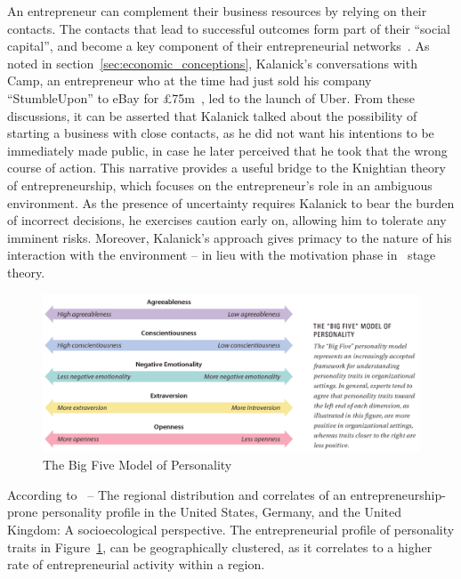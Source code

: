     An entrepreneur can complement their business resources by relying on their contacts. The contacts that lead to successful outcomes form part of their ``social capital'', and become a key component of their entrepreneurial networks~\parencite{burt1995}. As noted in section~\ref{sec:economic_conceptions}, Kalanick's conversations with Camp, an entrepreneur who at the time had just sold his company ``StumbleUpon'' to eBay for \pounds75m~\parencite{gonzalez2007}, led to the launch of Uber. From these discussions, it can be asserted that Kalanick talked about the possibility of starting a business with close contacts, as he did not want his intentions to be immediately made public, in case he later perceived that he took that the wrong course of action. This narrative provides a useful bridge to the Knightian theory of entrepreneurship, which focuses on the entrepreneur's role in an ambiguous environment. As the presence of uncertainty requires Kalanick to bear the burden of incorrect decisions, he exercises caution early on, allowing him to tolerate any imminent risks. Moreover, Kalanick's approach gives primacy to the nature of his interaction with the environment -- in lieu with the motivation phase in~\parencite{wilken1979} stage theory.

    \begin{figure}
      \centering
      \begin{minipage}{14cm}
        \centering
        \includegraphics[width=14cm]{inc/the_big_five_model_of_personality.png}
        \caption[The Big Five Model of Personality]{The Big Five Model of Personality}
        \label{fig:the_big_five_model_of_personality}
      \end{minipage}
    \end{figure}

    According to~\parencite{obschonka2013} -- The regional distribution and correlates of an entrepreneurship-prone personality profile in the United States, Germany, and the United Kingdom: A socioecological perspective. The entrepreneurial profile of personality traits in Figure~\ref{fig:the_big_five_model_of_personality}, can be geographically clustered, as it correlates to a higher rate of entrepreneurial activity within a region. 

